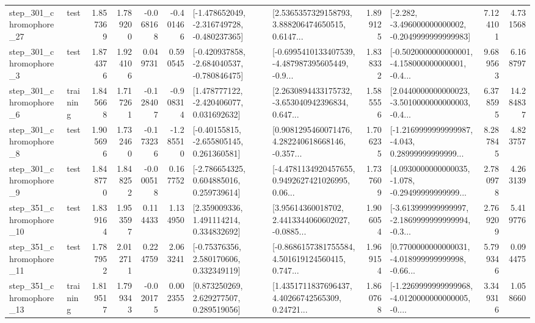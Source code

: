 \begin{tabular}{llrrrrllrlrr}
  step\_301\_chromophore\_27 &      test &      1.857369 &    1.789200 &     -0.068168 & -0.401466 &  [-1.478652049, -2.316749728, -0.480237365] &  [2.5365357329158793, 3.888206474650515, 0.6147... &       1.899125 &  [-2.282, -3.496000000000002, -0.2049999999999983] &            7.124101 &          4.731568 \\
   step\_301\_chromophore\_3 &      test &      1.874376 &    1.924106 &      0.049731 &  0.590545 &  [-0.420937858, -2.684040537, -0.780846475] &  [-0.6995410133407539, -4.487987395605449, -0.9... &       1.838332 &  [-0.5020000000000001, -4.158000000000001, -0.4... &            9.689563 &          6.168797 \\
   step\_301\_chromophore\_6 &  training &      1.845668 &    1.717261 &     -0.128407 & -0.908314 &    [1.478777122, -2.420406077, 0.031692632] &  [2.2630894433175732, -3.653040942396834, 0.647... &       1.585556 &  [2.0440000000000023, -3.5010000000000003, -0.4... &            6.378595 &         14.284837 \\
   step\_301\_chromophore\_8 &      test &      1.905696 &    1.732460 &     -0.173236 & -1.285510 &    [-0.40155815, -2.655805145, 0.261360581] &  [0.9081295460071476, 4.282240618668146, -0.357... &       1.706235 &  [-1.2169999999999987, -4.043, 0.28999999999999... &            8.287845 &          4.823757 \\
   step\_301\_chromophore\_9 &      test &      1.848770 &    1.848252 &     -0.000518 &  0.167752 &    [-2.786654325, 0.604885016, 0.259739614] &  [-4.4781134920457655, 0.9492627421026995, 0.06... &       1.737609 &  [4.0930000000000035, -1.078, -0.29499999999999... &            2.780978 &          4.263139 \\
  step\_351\_chromophore\_10 &      test &      1.839164 &    1.953597 &      0.114433 &  1.134950 &     [2.359009336, 1.491114214, 0.334832692] &  [3.95614360018702, 2.4413344060602027, -0.0885... &       1.906054 &  [-3.613999999999997, -2.1869999999999994, -0.3... &            2.769209 &          5.419776 \\
  step\_351\_chromophore\_11 &      test &      1.787952 &    2.012711 &      0.224759 &  2.063241 &     [-0.75376356, 2.580170606, 0.332349119] &  [-0.8686157381755584, 4.501619124560415, 0.747... &       1.969154 &  [0.7700000000000031, -4.018999999999998, -0.66... &            5.799346 &          0.094475 \\
  step\_351\_chromophore\_13 &  training &      1.819517 &    1.799343 &     -0.020175 &  0.002355 &     [0.873250269, 2.629277507, 0.289519056] &  [1.4351711837696437, 4.40266742565309, 0.24721... &       1.860768 &  [-1.2269999999999968, -4.0120000000000005, -0.... &            3.349316 &          1.058660 \\

\end{tabular}
